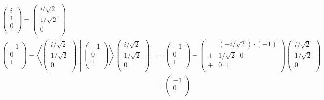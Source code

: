 \documentclass[dvipdfmx]{jsarticle}
\begin{document}
\begin{align*}
\begin{pmatrix}
i \\
1 \\
0 \\
\end{pmatrix} = \begin{pmatrix}
{i}/{\sqrt{2}} \\
{1}/{\sqrt{2}} \\
0 \\
\end{pmatrix}\\
\begin{pmatrix}
 - 1 \\
0 \\
1 \\
\end{pmatrix} - \left\langle \begin{pmatrix}
{i}/{\sqrt{2}} \\
{1}/{\sqrt{2}} \\
0 \\
\end{pmatrix} \middle| \begin{pmatrix}
 - 1 \\
0 \\
1 \\
\end{pmatrix} \right\rangle\begin{pmatrix}
{i}/{\sqrt{2}} \\
{1}/{\sqrt{2}} \\
0 \\
\end{pmatrix} &= \begin{pmatrix}
 - 1 \\
0 \\
1 \\
\end{pmatrix} - \begin{pmatrix}
\  & \left( - {i}/{\sqrt{2}} \right) \cdot ( - 1) \\
 + & 1/\sqrt{2} \cdot 0 \\
 + & 0 \cdot 1 \\
\end{pmatrix}\begin{pmatrix}
{i}/{\sqrt{2}} \\
{1}/{\sqrt{2}} \\
0 \\
\end{pmatrix}\\
&= \begin{pmatrix}
 - 1 \\
0 \\

\end{pmatrix}
\end{align*}
\end{document}
